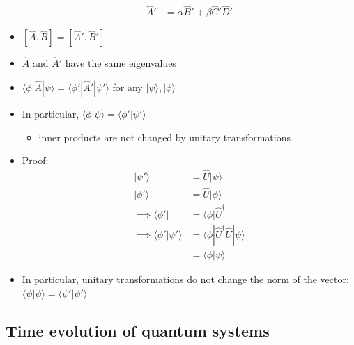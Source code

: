 \documentclass[a4paper,11pt,normalem]{article}
\begin{document}
\begin{itemize}
\[\begin{aligned}
    \hat{A}' &= \alpha\hat{B}' + \beta\hat{C}'\hat{D}'
    \end{aligned}
\]
\item
  \([\hat{A},\hat{B}] = [\hat{A}', \hat{B}']\)
\item
  \(\hat{A}\) and \(\hat{A}'\) have the same eigenvalues
\item
  \(\langle\phi|\hat{A}|\psi\rangle = \langle\phi'|\hat{A}'|\psi'\rangle\)
  for any \(|\psi\rangle,|\phi\rangle\)
\item
  In particular, \(\langle\phi|\psi\rangle = \langle\phi'|\psi'\rangle\)
  \begin{itemize}
  \item
    inner products are not changed by unitary transformations
  \end{itemize}
\item
  Proof:
\[
    \begin{aligned}
    |\psi'\rangle &= \hat{U}|\psi\rangle \\
    |\phi'\rangle &= \hat{U}|\phi\rangle \\
    \implies \langle\phi'| &= \langle\phi|\hat{U}^\dagger \\
    \implies \langle\phi'|\psi'\rangle &= \langle\phi|\hat{U}^\dagger\hat{U}|\psi\rangle \\
    &= \langle\phi|\psi\rangle
    \end{aligned}
\]
\item
  In particular, unitary transformations do not change the norm of the
  vector: \(\langle\psi|\psi\rangle = \langle\psi'|\psi'\rangle\)
\end{itemize}

\subsection{Time evolution of quantum systems}\label{time-evolution-of-quantum-systems}
\end{document}
